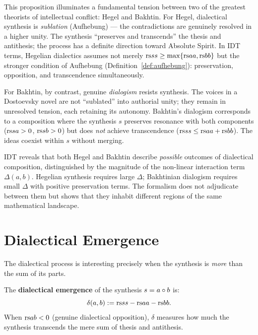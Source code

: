 \begin{interpretation}
\label{interp:ch16:bakhtin_vs_hegel}
This proposition illuminates a fundamental tension between two of the
greatest theorists of intellectual conflict: Hegel and Bakhtin.  For Hegel,
dialectical synthesis is \emph{sublation} (Aufhebung) --- the contradictions
are genuinely resolved in a higher unity.  The synthesis ``preserves and
transcends'' the thesis and antithesis; the process has a definite
direction toward Absolute Spirit.  In IDT terms, Hegelian dialectics assumes
not merely $\mathrm{rs}{s}{s} \geq \max\{\mathrm{rs}{a}{a}, \mathrm{rs}{b}{b}\}$ but the stronger
condition of Aufhebung (Definition~\ref{def:aufhebung}): preservation,
opposition, and transcendence simultaneously.

For Bakhtin, by contrast, genuine \emph{dialogism} resists synthesis.  The
voices in a Dostoevsky novel are not ``sublated'' into authorial unity; they
remain in unresolved tension, each retaining its autonomy.  Bakhtin's
dialogism corresponds to a composition where the synthesis $s$ preserves
resonance with both components ($\mathrm{rs}{s}{a} > 0$, $\mathrm{rs}{s}{b} > 0$) but
does \emph{not} achieve transcendence ($\mathrm{rs}{s}{s} \leq \mathrm{rs}{a}{a} +
\mathrm{rs}{b}{b}$).  The ideas coexist within $s$ without merging.

IDT reveals that both Hegel and Bakhtin describe \emph{possible} outcomes
of dialectical composition, distinguished by the magnitude of the
non-linear interaction term $\Delta(a,b)$.  Hegelian synthesis requires
large $\Delta$; Bakhtinian dialogism requires small $\Delta$ with
positive preservation terms.  The formalism does not adjudicate between
them but shows that they inhabit different regions of the same
mathematical landscape.
\end{interpretation}

\section{Dialectical Emergence}

The dialectical process is interesting precisely when the synthesis is
\emph{more} than the sum of its parts.

\begin{definition}
\label{def:dialectical-emergence}
The \textbf{dialectical emergence} of the synthesis $s = a \circ b$ is:
\[
  \delta(a, b) := \mathrm{rs}{s}{s} - \mathrm{rs}{a}{a} - \mathrm{rs}{b}{b}.
\]
When $\mathrm{rs}{a}{b} < 0$ (genuine dialectical opposition), $\delta$ measures how
much the synthesis transcends the mere sum of thesis and antithesis.
\end{definition}

